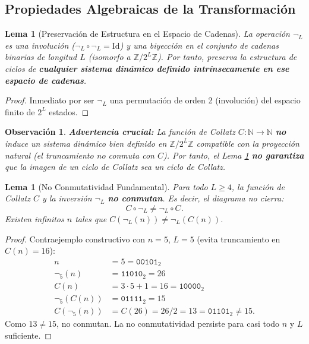\documentclass[11pt,a4paper]{article}
\newtheorem{lemma}[theorem]{Lema}
\newtheorem{remark}[theorem]{Observación}
\begin{document}
\subsection{Propiedades Algebraicas de la Transformación}

\begin{lemma}[Preservación de Estructura en el Espacio de Cadenas]
\label{lemma:preservacion_bits}
La operación $\neg_L$ es una involución ($\neg_L \circ \neg_L = \text{Id}$) y una biyección en el conjunto de cadenas binarias de longitud $L$ (isomorfo a $\mathbb{Z}/2^L\mathbb{Z}$). Por tanto, preserva la estructura de ciclos de \textbf{cualquier sistema dinámico definido intrínsecamente en ese espacio de cadenas}.
\end{lemma}

\begin{proof}
Inmediato por ser $\neg_L$ una permutación de orden 2 (involución) del espacio finito de $2^L$ estados.
\end{proof}

\begin{remark}
\textbf{Advertencia crucial:} La función de Collatz $C: \mathbb{N} \to \mathbb{N}$ \textbf{no} induce un sistema dinámico bien definido en $\mathbb{Z}/2^L\mathbb{Z}$ compatible con la proyección natural (el truncamiento no conmuta con $C$). Por tanto, el Lema \ref{lemma:preservacion_bits} \textbf{no garantiza} que la imagen de un ciclo de Collatz sea un ciclo de Collatz.
\end{remark}

\begin{lemma}[No Conmutatividad Fundamental]
\label{lemma:no_conmuta}
Para todo $L \ge 4$, la función de Collatz $C$ y la inversión $\neg_L$ \textbf{no conmutan}. Es decir, el diagrama no cierra:
\[
C \circ \neg_L \neq \neg_L \circ C.
\]
Existen infinitos $n$ tales que $C(\neg_L(n)) \neq \neg_L(C(n))$.
\end{lemma}

\begin{proof}
Contraejemplo constructivo con $n=5$, $L=5$ (evita truncamiento en $C(n)=16$):
\begin{align*}
n &= 5 = \mathtt{00101}_2 \\
\neg_5(n) &= \mathtt{11010}_2 = 26 \\
C(n) &= 3\cdot5+1 = 16 = \mathtt{10000}_2 \\
\neg_5(C(n)) &= \mathtt{01111}_2 = 15 \\
C(\neg_5(n)) &= C(26) = 26/2 = 13 = \mathtt{01101}_2 \neq 15.
\end{align*}
Como $13 \neq 15$, no conmutan. La no conmutatividad persiste para casi todo $n$ y $L$ suficiente.
\end{proof}
\end{document}
